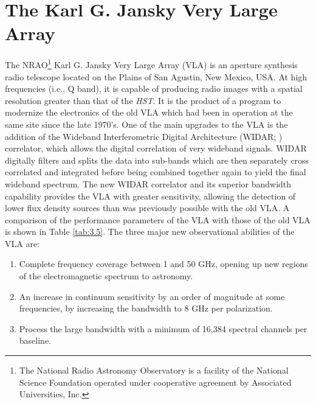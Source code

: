 \section{The Karl G. Jansky Very Large Array}\label{sec:3.5}
The NRAO\footnote{The National Radio Astronomy Observatory is a facility of the National Science Foundation operated under cooperative agreement by Associated Universities, Inc.} Karl G. Jansky Very Large Array (VLA) is an aperture synthesis radio telescope located on the Plains of San Agustin, New Mexico, USA. At high frequencies (i.e., Q band), it is capable of producing radio images with a spatial resolution greater than that of the \textit{HST}. It is the product of a program to modernize the electronics of the old VLA which had been in operation at the same site since the late 1970's. One of the main upgrades to the VLA is the addition of the Wideband Interferometric Digital Architecture (WIDAR; \citealt{carlson_2001}) correlator, which allows the digital correlation of very wideband signals. WIDAR digitally filters and splits the data into sub-bands which are then separately cross correlated and integrated before being combined together again to yield the final wideband spectrum. The new WIDAR correlator and its superior bandwidth capability provides the VLA with greater sensitivity, allowing the detection of lower flux density sources than was previously possible with the old VLA. A comparison of the performance parameters of the VLA with those of the old VLA is shown in Table \ref{tab:3.5}. The three major new observational abilities of the VLA are:
\begin{enumerate}
\item Complete frequency coverage between 1 and 50 GHz, opening up new regions of the electromagnetic spectrum to astronomy.
\item An increase in continuum sensitivity by an order of magnitude at some frequencies, by increasing the bandwidth to 8 GHz per polarization.
\item Process the large bandwidth with a minimum of 16,384 spectral channels per baseline.
\end{enumerate}


